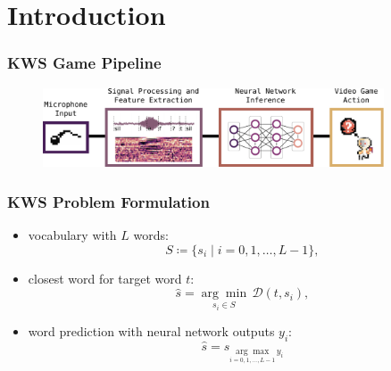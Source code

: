 
\section{Introduction}

\begin{frame}
  \frametitle{KWS Game Pipeline}
  \begin{figure} \includegraphics[width=0.9\textwidth]{../1_intro/figs/intro_kws.pdf} \end{figure}
  \scriptsize
  \vspace{0.3cm}
  \centering
\end{frame}

\begin{frame}
  \frametitle{KWS Problem Formulation}
  \begin{itemize}
    \item vocabulary with $L$ words:
    \begin{equation*}\label{eq:intro_kws_dict}
      S \coloneqq \{s_i \mid i = 0, 1, \dots, L - 1\},
    \end{equation*}

    \item closest word for target word $t$:
    \begin{equation*}\label{eq:intro_kws_task}
      \hat{s} = \underset{s_i \in S}{\arg \min} \, \mathcal{D}(t, s_i),
    \end{equation*}

    \item word prediction with neural network outputs $y_i$:
    \begin{equation*}\label{eq:intro_kws_class}
      \hat{s} = s_{\underset{i = 0, 1, \dots, L - 1}{\arg \max} \, y_i}
    \end{equation*}

  \end{itemize}
\end{frame}
